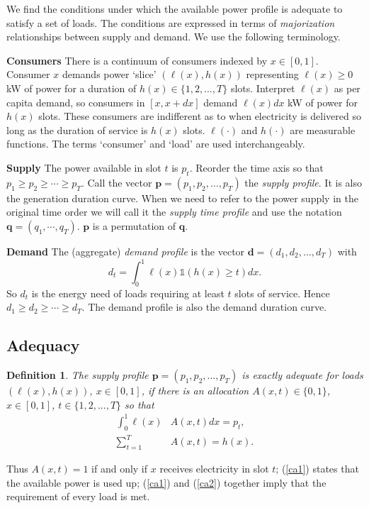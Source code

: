 \documentclass[10pt,draftcls,onecolumn]{IEEEtran}
\newtheorem{definition}{Definition}
\let \VEC \mathbf
\def\ind{{\mathds{1}}}
\newcounter{l1}
\newcounter{l2}
\newcounter{l3}
\begin{document}
We  find the conditions under which  the available power profile is adequate to satisfy a set of loads.
The  conditions are expressed  in terms of \textit{majorization} relationships between supply and demand. 
We use the following terminology.




\textbf{Consumers} There is a continuum of consumers indexed by $x \in [0,1]$. 
 Consumer $x$ demands power `slice' $(\ell(x), h(x))$ representing $\ell(x) \ge 0$ kW of power for a duration of $h(x) \in \{1,2,\ldots,T\}$ slots. Interpret $\ell(x)$ as per capita demand, so  consumers in $[x,x+dx]$ demand  $\ell(x)dx$ kW of power for $h(x)$ slots.  These consumers are indifferent as to when electricity is delivered so long as  the duration of service is $h(x)$ slots. $\ell(\cdot)$ and $h(\cdot)$ are  measurable functions. 
The terms `consumer' and `load' are used interchangeably. 


\textbf{Supply} 
The  power available in slot $t$ is $p_t$.  Reorder the time axis so that $p_1 \ge p_2 \ge \cdots \ge p_T$.  Call the vector $\VEC p=(p_1,p_2,\ldots,p_T)$ the \textit{supply profile}. It is also the generation duration curve.  When we need to refer to the power supply in the original time order we will call it
the \textit{supply time profile} and use the notation $\VEC q = (q_1, \cdots , q_T)$.  $\VEC p$ is a permutation of $\VEC q$.


\textbf{Demand} The (aggregate) \emph{demand profile} is the vector $ \VEC d=(d_1,d_2,\ldots,d_T)$ with 
\[d_t=\int_0^1 \ell(x) \ind(h(x) \geq t ) dx.\]  
So $d_t$ is the energy need of  loads requiring at least $t$ slots of service.  Hence $d_1 \ge d_2 \ge \cdots \ge d_T$.  The demand profile is also the demand duration curve.


\subsection{Adequacy}
\begin{definition}
The supply profile $\VEC p=(p_1,p_2,\ldots,p_T)$ is  \emph{exactly adequate} for loads $(\ell(x),h(x))$, $x \in [0,1]$, if there is an allocation  $A(x,t) \in \{0,1\}$, $x \in [0,1]$, $t \in \{1,2,...,T\}$  so that
\begin{align}
\int_0^1 \ell(x)&A(x,t)dx = p_t ,\label{ca1}\\
\sum_{t=1}^T &A(x,t) = h(x) .\label{ca2}
\end{align}
\end{definition}
\noindent 
Thus
$A(x,t) = 1$ if and only if $x$ receives electricity in slot $t$;
 (\ref{ca1}) states that  the available power is used up;    (\ref{ca1}) and  (\ref{ca2}) together imply that the requirement of every load is met.
\end{document}
